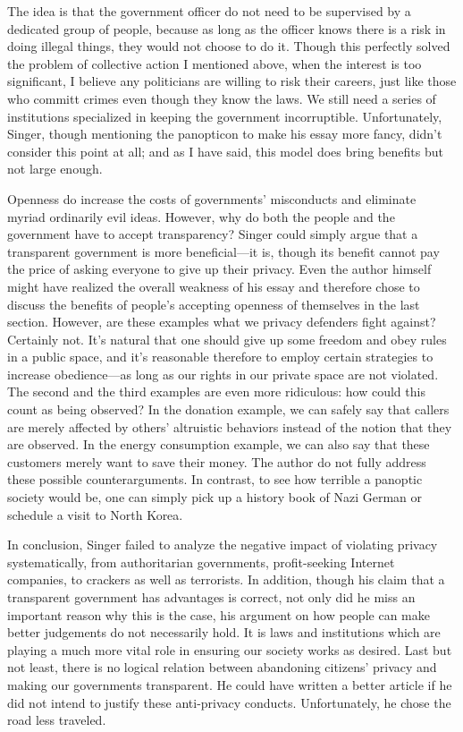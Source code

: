 \documentclass{writing}
\begin{document}
The idea is that the government officer do not need to be supervised by
a dedicated group of people, because as long as the officer knows there
is a risk in doing illegal things, they would not choose to do it.
Though this perfectly solved the problem of collective action I
mentioned above, when the interest is too significant, I believe any
politicians are willing to risk their careers, just like those who
committ crimes even though they know the laws. We still need a series of
institutions specialized in keeping the government incorruptible.
Unfortunately, Singer, though mentioning the panopticon to make his
essay more fancy, didn't consider this point at all; and as I have said,
this model does bring benefits but not large enough.

Openness do increase the costs of governments' misconducts and eliminate
myriad ordinarily evil ideas. However, why do both the people and the
government have to accept transparency? Singer could simply argue that a
transparent government is more beneficial---it is, though its benefit
cannot pay the price of asking everyone to give up their privacy. Even
the author himself might have realized the overall weakness of his essay
and therefore chose to discuss the benefits of people's accepting
openness of themselves in the last section. However, are these examples
what we privacy defenders fight against? Certainly not. It's natural
that one should give up some freedom and obey rules in a public space,
and it's reasonable therefore to employ certain strategies to increase
obedience---as long as our rights in our private space are not violated.
The second and the third examples are even more ridiculous: how could
this count as being observed? In the donation example, we can safely say
that callers are merely affected by others' altruistic behaviors instead
of the notion that they are observed. In the energy consumption example,
we can also say that these customers merely want to save their money.
The author do not fully address these possible counterarguments. In
contrast, to see how terrible a panoptic society would be, one can
simply pick up a history book of Nazi German or schedule a visit to
North Korea.

In conclusion, Singer failed to analyze the negative impact of violating
privacy systematically, from authoritarian governments, profit-seeking
Internet companies, to crackers as well as terrorists. In addition,
though his claim that a transparent government has advantages is
correct, not only did he miss an important reason why this is the case,
his argument on how people can make better judgements do not necessarily
hold. It is laws and institutions which are playing a much more vital
role in ensuring our society works as desired. Last but not least, there
is no logical relation between abandoning citizens' privacy and making
our governments transparent. He could have written a better article if
he did not intend to justify these anti-privacy conducts. Unfortunately,
he chose the road less traveled.
\end{document}
